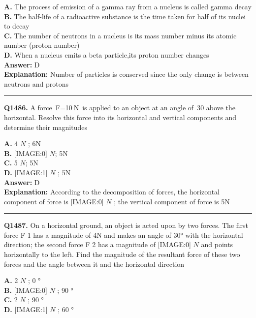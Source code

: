 \documentclass[12pt]{article}
\begin{document}
\textbf{A.} The process of emission of a gamma ray from a nucleus is called gamma decay \\
\textbf{B.} The half-life of a radioactive substance is the time taken for half of its nuclei to decay \\
\textbf{C.} The number of neutrons in a nucleus is its mass number minus its atomic number (proton number) \\
\textbf{D.} When a nucleus emits a beta particle,its proton number changes \\

\textbf{Answer:} D \\
\textbf{Explanation:} Number of particles is conserved since the only change is between neutrons and protons

\hrule
\vspace{1em}


\noindent
\textbf{Q1486.} A force F=10 N is applied to an object at an angle of 30
\circ 
above the horizontal. Resolve this force into its horizontal and vertical components and determine their magnitudes



\textbf{A.} 4
$𝑁$
; 6N \\
\textbf{B.} [IMAGE:0]
$𝑁$; 5N \\
\textbf{C.} 5
$𝑁$; 5N \\
\textbf{D.} [IMAGE:1]
$𝑁$
;
5N \\

\textbf{Answer:} D \\
\textbf{Explanation:} According to the decomposition of forces, the horizontal component of force is
[IMAGE:0]
$𝑁$
; the vertical component of force is 5N

\hrule
\vspace{1em}


\noindent
\textbf{Q1487.} On a horizontal ground, an object is acted upon by two forces. The first force F
1
has a magnitude of 4N and makes an angle of 30° with the horizontal direction; the second force F
2
has a magnitude of
[IMAGE:0]
$𝑁$
and points horizontally to the left. Find the magnitude of the resultant force of these two forces and the angle between it and the horizontal direction



\textbf{A.} 2
$𝑁$
; 0
° \\
\textbf{B.} [IMAGE:0]
$𝑁$
; 90
° \\
\textbf{C.} 2
$𝑁$
;
90
° \\
\textbf{D.} [IMAGE:1]
$𝑁$
; 60
° \\
\end{document}

